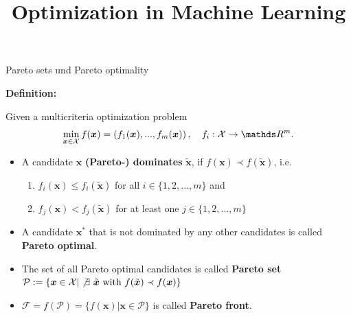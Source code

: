 \documentclass[11pt,compress,t,notes=noshow, xcolor=table]{beamer}
\title{Optimization in Machine Learning}
\date{}
\begin{document}
\sloppy


\begin{vbframe}{Pareto sets und Pareto optimality}

\textbf{Definition:}

Given a multicriteria optimization problem $$\min_{\bm{x} \in \Xspace} f(\bm{x}) = \left(f_1(\bm{x}), ..., f_m(\bm{x})\right), \quad f_i: \Xspace \to \R^m.$$

\begin{itemize}
\item A candidate $\bm{x}$ \textbf{(Pareto-) dominates} $\bm{\tilde{x}}$, if $f(\bm{x}) \prec f( \tilde{\bm x})$, i.e.
\begin{enumerate}
\item $f_i(\bm{x}) \le f_i(\tilde{\bm x})$ for all $i \in \{1, 2, ..., m\}$ and
\item $f_j(\bm{x}) < f_j(\tilde{\bm x})$ for at least one $j \in \{1, 2, ..., m\}$
\end{enumerate}
\vspace*{0.1cm}
\item A candidate $\bm{x}^*$ that is not dominated by any other candidates is called \textbf{Pareto optimal}.
\vspace*{0.1cm}
\item The set of all Pareto optimal candidates is called \textbf{Pareto set} $\mathcal{P} := \{\bm{x} \in \mathcal{X} |\not \exists ~\tilde{\bm{x}} \text{ with } f(\tilde{\bm{x}}) \prec f(\bm{x})\}$
\item $\mathcal{F} = f(\mathcal{P}) = \{f(\bm{x}) | \bm{x} \in \mathcal{P}\}$ is called \textbf{Pareto front}.
\end{itemize}

\end{vbframe}
\end{document}
